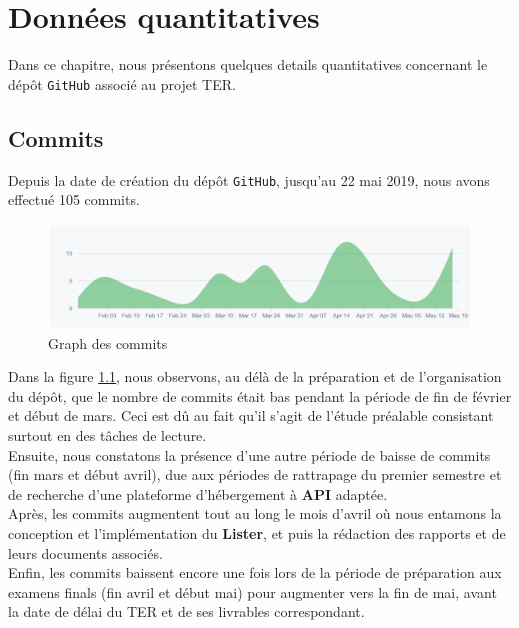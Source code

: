 \documentclass[12pt,a4paper]{report}
\begin{document}
\chapter{Données quantitatives}
Dans ce chapitre, nous présentons quelques details quantitatives concernant le dépôt \texttt{GitHub} associé au projet TER.

\section{Commits}
Depuis la date de création du dépôt \texttt{GitHub}, jusqu'au 22 mai 2019, nous avons effectué 105 commits.

\begin{figure}[!ht]
\hspace*{-2.6cm}
\includegraphics[scale=0.55]{images/contributor_graph_git.PNG}
\caption{Graph des commits}
\label{fig:commits}
\end{figure}

Dans la figure \textcolor{BrickRed}{\ref{fig:commits}}, nous observons, au délà de la préparation et de l'organisation du dépôt, que le nombre de commits était bas pendant la période de fin de février et début de mars. Ceci est dû au fait qu'il s'agit de l'étude préalable consistant surtout en des tâches de lecture.\\
Ensuite, nous constatons la présence d'une autre période de baisse de commits (fin mars et début avril), due aux périodes de rattrapage du premier semestre et de recherche d'une plateforme d'hébergement à \textbf{API} adaptée.\\
Après, les commits augmentent tout au long le mois d'avril où nous entamons la conception et l'implémentation du \textbf{Lister}, et puis la rédaction des rapports et de leurs documents associés.\\
Enfin, les commits baissent encore une fois lors de la période de préparation aux examens finals (fin avril et début mai) pour augmenter vers la fin de mai, avant la date de délai du TER et de ses livrables correspondant.
\end{document}
